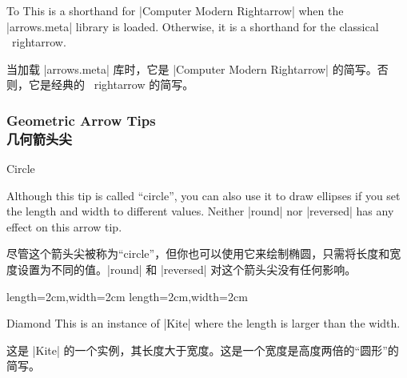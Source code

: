\begin{arrowtipsimple}{To}
    This is a shorthand for |Computer Modern Rightarrow| when the |arrows.meta|
    library is loaded. Otherwise, it is a shorthand for the classical
    \tikzname\ rightarrow.

    当加载 |arrows.meta| 库时，它是 |Computer Modern Rightarrow| 的简写。否则，它是经典的 \tikzname\ rightarrow 的简写。


\end{arrowtipsimple}


\subsubsection{Geometric Arrow Tips\\几何箭头尖}

\begin{arrowtip}{Circle}{
    Although this tip is called ``circle'', you can also use it to draw
    ellipses if you set the length and width to different values. Neither
    |round| nor |reversed| has any effect on this arrow tip.

    尽管这个箭头尖被称为“circle”，但你也可以使用它来绘制椭圆，只需将长度和宽度设置为不同的值。|round| 和 |reversed| 对这个箭头尖没有任何影响。

}%
{length=2cm,width=2cm}%
{length=2cm,width=2cm}

    \begin{arrowexamples}
        \arrowexample[]
        \arrowexampledup[sep]
        \arrowexampledupdot[sep]
        \arrowexample[open]
        \arrowexample[length=3pt]
        \arrowexample[slant=.3]
        \arrowexample[left]
        \arrowexample[right]
        \arrowexample[red]
    \end{arrowexamples}
\end{arrowtip}

\begin{arrowtipsimple}{Diamond}
    This is an instance of |Kite| where the length is larger than the width.
    
    这是 |Kite| 的一个实例，其长度大于宽度。这是一个宽度是高度两倍的“圆形”的简写。

%
    \begin{arrowexamples}
        \arrowexample[]
        \arrowexampledup[]
        \arrowexampledupdot[]
        \arrowexample[open]
        \arrowexample[length=10pt]
        \arrowexample[round]
        \arrowexample[slant=.3]
        \arrowexample[left]
        \arrowexample[right]
        \arrowexample[red]
        \arrowexample[fill=red!50]
    \end{arrowexamples}
\end{arrowtipsimple}

